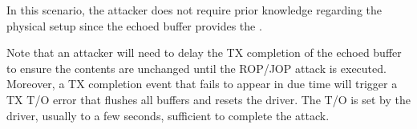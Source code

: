 
In this scenario, the attacker does not require prior knowledge regarding the physical setup since the echoed buffer provides the \kva.  

Note that an attacker will need to delay the TX completion of the echoed buffer to ensure the contents are unchanged until the ROP/JOP attack is executed.
Moreover, a TX completion event that fails to appear in due time will trigger a TX T/O error that flushes all buffers and resets the driver. The T/O is set by the driver, usually to a few seconds, sufficient to complete the attack.








